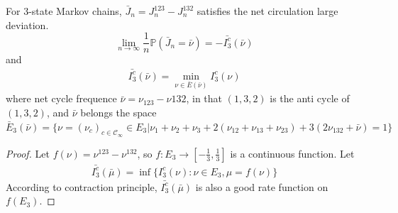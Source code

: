 \documentclass[11pt,en,cite=authoryear]{elegantpaper}
\begin{document}
\begin{corollary}
    For 3-state Markov chains, $\bar{J}_n = J^{123}_n - J^{132}_n$ satisfies the net circulation large deviation.
    \begin{equation*} \label{eq:net}
        \lim_{n \rightarrow \infty} \frac{1}{n} \mathbb{P}(\bar{J}_n = \bar{\nu}) = - \bar{I^c_3}(\bar{\nu})
    \end{equation*}
    and
    \begin{align*}
        \bar{I^c_3}(\bar{\nu}) = \min_{\nu \in \bar{E}(\bar{\nu})} I^c_3(\nu)
    \end{align*}
    where net cycle frequence $\bar{\nu} = \nu_{123} - \nu{132}$, in that $(1,3,2)$ is the anti cycle of $(1,3,2)$, and $\bar{\nu}$ belongs the space
    $\bar{E}_3(\bar{\nu}) = \{\nu = (\nu_c)_{c \in \mathcal{C}_{\infty}} \in E_3 | \nu_1 +\nu_2 +\nu_3 +2(\nu_{12} +\nu_{13} +\nu_{23}) +3(2\nu_{132} +\bar{\nu})=1\}$
\end{corollary}
\begin{proof}
    Let $f(\nu) = \nu^{123} - \nu^{132}$, so $f: E_3 \rightarrow [-\frac{1}{3}, \frac{1}{3}]$ is a continuous function. Let
    \begin{align*}
        \bar{I^c_3}(\bar{\mu}) = \inf \{I^c_3(\nu): \nu \in E_3, \mu = f(\nu)\}
    \end{align*}
    According to contraction principle, $\bar{I^c_3}(\bar{\mu})$ is also a good rate function on $f(E_3)$.
\end{proof}
\end{document}
